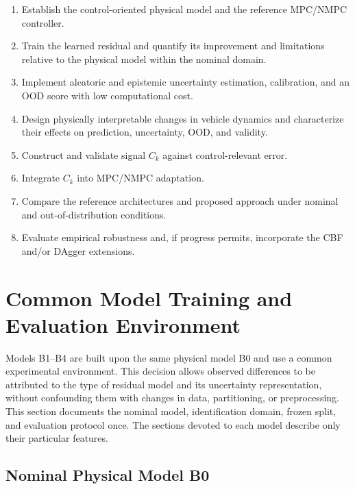 \documentclass[12pt,a4paper]{report}
\begin{document}
\begin{enumerate}[label=\textbf{S\arabic*:}]
    \item Establish the control-oriented physical model and the reference MPC/NMPC controller.

    \item Train the learned residual and quantify its improvement and limitations relative to the physical model within the nominal domain.

    \item Implement aleatoric and epistemic uncertainty estimation, calibration, and an OOD score with low computational cost.

    \item Design physically interpretable changes in vehicle dynamics and characterize their effects on prediction, uncertainty, OOD, and validity.

    \item Construct and validate signal \(C_k\) against control-relevant error.

    \item Integrate \(C_k\) into MPC/NMPC adaptation.

    \item Compare the reference architectures and proposed approach under nominal and out-of-distribution conditions.

    \item Evaluate empirical robustness and, if progress permits, incorporate the CBF and/or DAgger extensions.
\end{enumerate}

\section{Common Model Training and Evaluation Environment}
\label{sec:entorno_comun_modelos}

Models B1--B4 are built upon the same physical model B0 and use a common experimental environment. This decision allows observed differences to be attributed to the type of residual model and its uncertainty representation, without confounding them with changes in data, partitioning, or preprocessing. This section documents the nominal model, identification domain, frozen split, and evaluation protocol once. The sections devoted to each model describe only their particular features.

\subsection{Nominal Physical Model B0}
\end{document}
